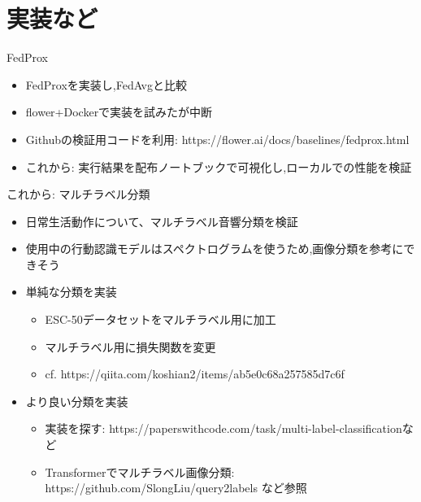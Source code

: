 \documentclass[unicode,12pt,aspectratio=169,dvipdfmx]{beamer}
\begin{document}
\section{実装など}
\begin{frame}{FedProx\cite{FedProx}}
\begin{itemize}
    \item FedProxを実装し,FedAvgと比較
    \item flower+Dockerで実装を試みたが中断
    \item Githubの検証用コードを利用: https://flower.ai/docs/baselines/fedprox.html
    \item これから: 実行結果を配布ノートブックで可視化し,ローカルでの性能を検証
\end{itemize}
\end{frame}

\begin{frame}{これから: マルチラベル分類}
\begin{itemize}
    \item 日常生活動作について、マルチラベル音響分類を検証
    \item 使用中の行動認識モデルはスペクトログラムを使うため,画像分類を参考にできそう
    \item 単純な分類を実装
    \begin{itemize}
        \item ESC-50データセットをマルチラベル用に加工
        \item マルチラベル用に損失関数を変更
        \item cf. https://qiita.com/koshian2/items/ab5e0c68a257585d7c6f
    \end{itemize}
    \item より良い分類を実装
    \begin{itemize}
        \item 実装を探す: https://paperswithcode.com/task/multi-label-classificationなど
        \item Transformerでマルチラベル画像分類: https://github.com/SlongLiu/query2labels など参照
    \end{itemize}
\end{itemize}
\end{frame}
\end{document}
